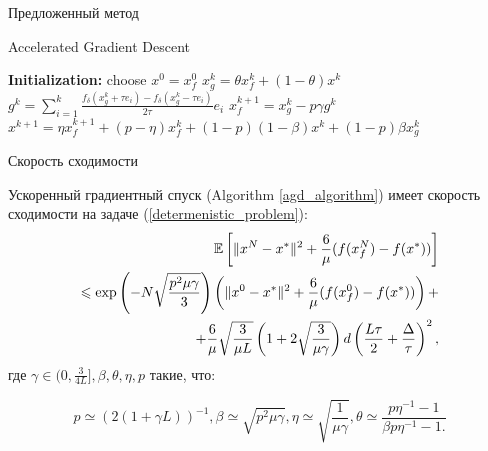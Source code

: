 \documentclass{beamer}
\begin{document}


\begin{frame}{Предложенный метод}

\begin{algorithm}[H]
\caption{ Accelerated Gradient Descent }
\label{agd_algorithm}
\begin{algorithmic}
\State\textbf{Initialization:} choose $x^0 = x_f^0$
		\State $x_g^k = \theta x_f^k + (1 - \theta)x^k$
		\State $g^k = \sum\limits_{i = 1}^k \frac{f_\delta(x_g^k + \tau e_i) - f_\delta(x_g^k - \tau e_i)}{2\tau}e_i$
		\State $x_f^{k + 1} = x_g^k - p \gamma g^k$
		\State $x^{k + 1} = \eta x_f^{k + 1} + (p - \eta) x_f^k + (1 - p)(1 - \beta) x^k + (1 - p)\beta x_g^k$
   \EndFor
\end{algorithmic}
\end{algorithm}

\end{frame}


\begin{frame}{Скорость сходимости}
\begin{theorem}\label{theorem1}
  Ускоренный градиентный спуск (Algorithm \ref{agd_algorithm}) имеет скорость сходимости на задаче (\ref{determenistic_problem}):
  \begin{equation}
   \begin{aligned}
   \mathbb{E}\left[\|x^N - x^*\|^2 + \frac{6}{\mu} (f(x_f^N) - f(x^*))\right] \hfill\\
   \leqslant \exp\left(- N\sqrt{\frac{p^2\mu\gamma}{3}}\right) \left(\|x^0 - x^*\|^2 + \frac{6}{\mu} (f(x_f^0) - f(x^*))\right) + \\
   + \frac{6}{\mu} \sqrt{\frac{3}{\mu L}} \left(1 + 2\sqrt{\frac{3}{\mu \gamma}}\right) d \left(\frac{L\tau}{2} + \frac{\Delta}{\tau}\right)^2,
   \label{deterministic_convergence}
   \end{aligned}
  \end{equation}
  где $\gamma \in (0, \frac{3}{4L}], \beta, \theta, \eta, p$ такие, что:

  \begin{equation}
   p \simeq (2(1 + \gamma L))^{-1}, \beta \simeq \sqrt{p^2 \mu \gamma}, \eta \simeq \sqrt{\frac{1}{\mu\gamma}}, \theta \simeq \frac{p \eta^{-1} - 1}{\beta p \eta^{-1} - 1.}
  \end{equation}

\end{theorem}
\end{frame}
\end{document}

